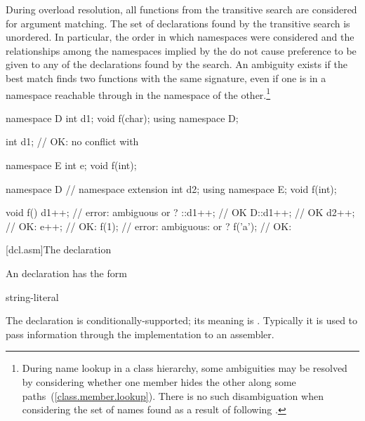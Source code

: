 \pnum
{}%
During overload resolution, all functions from the transitive search are
considered for argument matching. The set of declarations found by the
transitive search is unordered.
\enternote
In particular, the order in which namespaces were considered and the
relationships among the namespaces implied by the
 do not cause preference to be given to any
of the declarations found by the search.
\exitnote
An ambiguity exists if the best match finds two functions with the same
signature, even if one is in a namespace reachable through
 in the namespace of the other.\footnote{During
name lookup in a class hierarchy, some ambiguities may be
resolved by considering whether one member hides the other along some
paths~(\ref{class.member.lookup}). There is no such disambiguation when
considering the set of names found as a result of following
.}
\enterexample

\begin{codeblock}
namespace D {
  int d1;
  void f(char);
}
using namespace D;

int d1;             // OK: no conflict with 

namespace E {
  int e;
  void f(int);
}

namespace D {       // namespace extension
  int d2;
  using namespace E;
  void f(int);
}

void f() {
  d1++;             // error: ambiguous  or ?
  ::d1++;           // OK
  D::d1++;          // OK
  d2++;             // OK: 
  e++;              // OK: 
  f(1);             // error: ambiguous:  or ?
  f('a');           // OK: 
}
\end{codeblock}
\exitexample%
%

[dcl.asm]{The  declaration}%
%
%

\pnum
An  declaration has the form

\begin{bnf}
\br
     string-literal \terminal{) ;}
\end{bnf}

The  declaration is conditionally-supported; its meaning is
.
\enternote
Typically it is used to pass information through the implementation to
an assembler.
\exitnote

